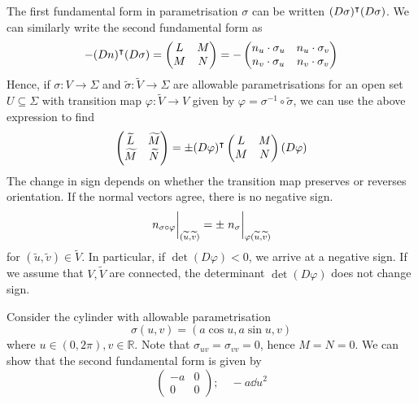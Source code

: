 \begin{remark}
	The first fundamental form in parametrisation \( \sigma \) can be written \( (D \sigma)^\intercal (D \sigma) \).
	We can similarly write the second fundamental form as
	\[ -(Dn)^\intercal (D\sigma) = \begin{pmatrix}
		L & M \\
		M & N
	\end{pmatrix} = -\begin{pmatrix}
		n_u \cdot \sigma_u & n_u \cdot \sigma_v \\
		n_v \cdot \sigma_u & n_v \cdot \sigma_v
	\end{pmatrix} \]
	Hence, if \( \sigma \colon V \to \Sigma \) and \( \widetilde \sigma \colon \widetilde V \to \Sigma \) are allowable parametrisations for an open set \( U \subseteq \Sigma \) with transition map \( \varphi \colon \widetilde V \to V \) given by \( \varphi = \sigma^{-1} \circ \widetilde \sigma \), we can use the above expression to find
	\[ \begin{pmatrix}
		\widetilde L & \widetilde M \\
		\widetilde M & \widetilde N
	\end{pmatrix} = \pm (D\varphi)^\intercal \begin{pmatrix}
		L & M \\
		M & N
	\end{pmatrix} (D\varphi) \]
	The change in sign depends on whether the transition map preserves or reverses orientation.
	If the normal vectors agree, there is no negative sign.
	\[ \eval{n_{\sigma \circ \varphi}}_{(\widetilde u, \widetilde v)} = \pm \eval{n_\sigma}_{\varphi(\widetilde u, \widetilde v)} \]
	for \( (\widetilde u, \widetilde v) \in \widetilde V \).
	In particular, if \( \det (D \varphi) < 0 \), we arrive at a negative sign.
	If we assume that \( V, \widetilde V \) are connected, the determinant \( \det (D \varphi) \) does not change sign.
\end{remark}
\begin{example}
	Consider the cylinder with allowable parametrisation
	\[ \sigma(u,v) = (a \cos u, a \sin u, v) \]
	where \( u \in (0,2\pi), v \in \mathbb R \).
	Note that \( \sigma_{uv} = \sigma_{vv} = 0 \), hence \( M = N = 0 \).
	We can show that the second fundamental form is given by
	\[ \begin{pmatrix}
		-a & 0 \\
		0 & 0
	\end{pmatrix};\quad -a \dd{u}^2 \]
\end{example}

